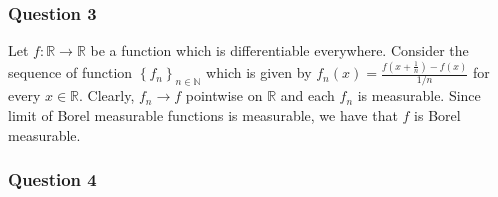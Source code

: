 \documentclass[12pt]{article}
\theoremstyle{definition}
\theoremstyle{remark}
\theoremstyle{plain}
\newcommand{\R}{\mathbb R}
\newcommand{\N}{\mathbb N}
\begin{document}
\subsubsection{Question 3}
Let $f: \R \to \R$ be a function which is differentiable everywhere. Consider the sequence of function $\left\{ f_n \right\}_{n\in \N}$ which is given by $f_n \left( x \right) = \frac{f\left( x+ \frac{1}{n} \right)-f\left( x \right) }{1/n}$ for every $x\in\R$. Clearly, $f_n \to f$ pointwise on $\R$ and each $f_n$ is measurable. Since limit of Borel measurable functions is measurable, we have that $f$ is Borel measurable. 

\subsubsection{Question 4}
\end{document}
